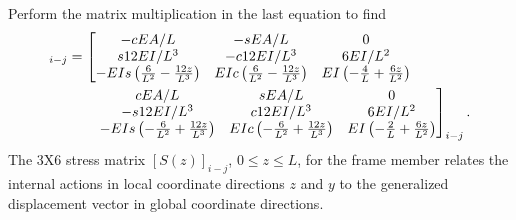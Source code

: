 \documentclass{AeroStructure-ERJohnson}
\begin{document}
Perform the matrix multiplication in the last equation to find
\begin{align}
[S(z)]_{i-j} &=\left[\begin{array}{@{}ccc@{}}-c E A / L & -s E A / L & 0 \\
s 12 E I / L^{3} & -c 12 E I / L^{3} & 6 E I / L^{2} \\
-E I s\left(\frac{6}{L^{2}}-\frac{12 z}{L^{3}}\right) & E I c\left(\frac{6}{L^{2}}-\frac{12 z}{L^{3}}\right) & E I\left(-\frac{4}{L}+\frac{6 z}{L^{2}}\right)\end{array}\right. \nonumber \\
&\qquad\left.\begin{array}{@{}ccc@{}}c E A / L & s E A / L & 0 \\-s 12 E I / L^{3} & c 12 E I / L^{3} & 6 E I / L^{2} \\-E I s\left(-\frac{6}{L^{2}}+\frac{12 z}{L^{3}}\right) & E I c\left(-\frac{6}{L^{2}}+\frac{12 z}{L^{3}}\right) & E I\left(-\frac{2}{L}+\frac{6 z}{L^{2}}\right)\end{array}\right]_{i-j}. \label{eq16.93}
\end{align}
The 3X6 stress matrix $[S(z)]_{i-j}$, $0 \leq z \leq L$, for the frame member relates the internal actions in local coordinate directions $z$ and $y$ to the generalized displacement vector in global coordinate directions.

\vspace*{-1pc}
\end{document}
